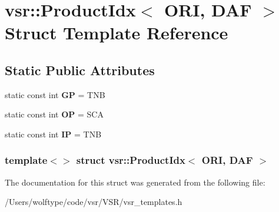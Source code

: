 \hypertarget{structvsr_1_1_product_idx_3_01_o_r_i_00_01_d_a_f_01_4}{\section{vsr\-:\-:Product\-Idx$<$ O\-R\-I, D\-A\-F $>$ Struct Template Reference}
\label{structvsr_1_1_product_idx_3_01_o_r_i_00_01_d_a_f_01_4}
}
\subsection*{Static Public Attributes}
\begin{DoxyCompactItemize}
\item 
\hypertarget{structvsr_1_1_product_idx_3_01_o_r_i_00_01_d_a_f_01_4_a61128e2499c684f62d45f42117f88eb2}{static const int {\bfseries G\-P} = T\-N\-B}\label{structvsr_1_1_product_idx_3_01_o_r_i_00_01_d_a_f_01_4_a61128e2499c684f62d45f42117f88eb2}

\item 
\hypertarget{structvsr_1_1_product_idx_3_01_o_r_i_00_01_d_a_f_01_4_a883f7f3a46c72ff9e571f8036a2350da}{static const int {\bfseries O\-P} = S\-C\-A}\label{structvsr_1_1_product_idx_3_01_o_r_i_00_01_d_a_f_01_4_a883f7f3a46c72ff9e571f8036a2350da}

\item 
\hypertarget{structvsr_1_1_product_idx_3_01_o_r_i_00_01_d_a_f_01_4_ab3f8895c0be1e5bcbc8e0460fcc8c568}{static const int {\bfseries I\-P} = T\-N\-B}\label{structvsr_1_1_product_idx_3_01_o_r_i_00_01_d_a_f_01_4_ab3f8895c0be1e5bcbc8e0460fcc8c568}

\end{DoxyCompactItemize}
\subsubsection*{template$<$$>$ struct vsr\-::\-Product\-Idx$<$ O\-R\-I, D\-A\-F $>$}



The documentation for this struct was generated from the following file\-:\begin{DoxyCompactItemize}
\item 
/\-Users/wolftype/code/vsr/\-V\-S\-R/vsr\-\_\-templates.\-h\end{DoxyCompactItemize}
